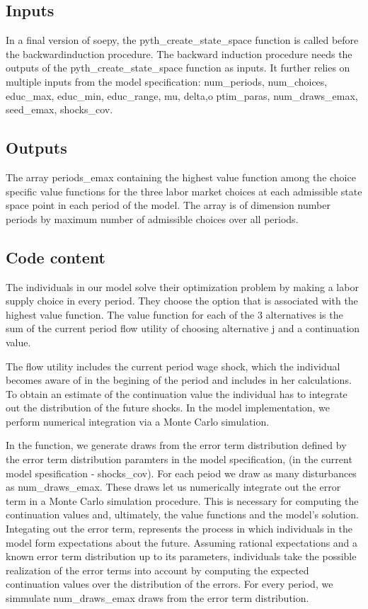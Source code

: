 \documentclass[letterpaper,10pt,english]{sphinxmanual}
\begin{document}
\subsection{Inputs}
\label{\detokenize{developer_docs:id2}}
In a final version of soepy, the pyth\_create\_state\_space function is called before the backwardinduction procedure. The backward induction procedure needs the outputs of the pyth\_create\_state\_space function as inputs. It further relies on multiple inputs from the model specification: num\_periods, num\_choices, educ\_max, educ\_min, educ\_range, mu, delta,o ptim\_paras, num\_draws\_emax, seed\_emax, shocks\_cov.


\subsection{Outputs}
\label{\detokenize{developer_docs:id3}}
The array periods\_emax containing the highest value function among the choice specific value functions for the three labor market choices at each admissible state space point in each period of the model. The array is of dimension number periods by maximum number of admissible choices over all periods.


\subsection{Code content}
\label{\detokenize{developer_docs:id4}}
The individuals in our model solve their optimization problem by making a labor supply choice in every period. They choose the option that is associated with the highest value function. The value function for each of the 3 alternatives is the sum of the current period flow utility of choosing alternative j and a continuation value.

The flow utility includes the current period wage shock, which the individual becomes aware of in the begining of the period and includes in her calculations. To obtain an estimate of the continuation value the individual has to integrate out the distribution of the future shocks. In the model implementation, we perform numerical integration via a Monte Carlo simulation.

In the function, we generate draws from the error term distribution defined by the error term distribution paramters in the model specification, (in the current model spesification - shocks\_cov). For each peiod we draw as many disturbances as num\_draws\_emax. These draws let us numerically integrate out the error term in a Monte Carlo simulation procedure. This is necessary for computing the continuation values and, ultimately, the value functions and the model’s solution. Integating out the error term, represents the process in which individuals in the model form expectations about the future. Assuming rational expectations and a known error term distribution up to its parameters, individuals take the possible realization of the error terms into account by computing the expected continuation values over the distribution of the errors. For every period, we simmulate num\_draws\_emax draws from the error term distribution.
\end{document}

